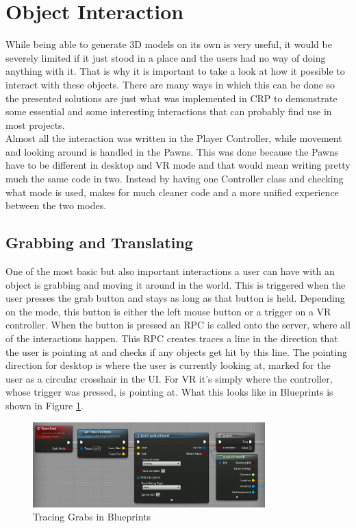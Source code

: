 
\section{Object Interaction}\label{chp:ObjectInteraction}
While being able to generate 3D models on its own is very useful, it would be severely limited if it just stood in a place and the users had no way of doing anything with it. That is why it is important to take a look at how it possible to interact with these objects. There are many ways in which this can be done so the presented solutions are just what was implemented in CRP to demonstrate some essential and some interesting interactions that can probably find use in most projects.\\
Almost all the interaction was written in the Player Controller, while movement and looking around is handled in the Pawns. This was done because the Pawns have to be different in desktop and VR mode and that would mean writing pretty much the same code in two. Instead by having one Controller class and checking what mode is used, makes for much cleaner code and a more unified experience between the two modes.
\subsection{Grabbing and Translating}

One of the most basic but also important interactions a user can have with an object is grabbing and moving it around in the world. This is triggered when the user presses the grab button and stays as long as that button is held. Depending on the mode, this button is either the left mouse button or a trigger on a VR controller. When the button is pressed an RPC is called onto the server, where all of the interactions happen. This RPC creates traces a line in the direction that the user is pointing at and checks if any objects get hit by this line. The pointing direction for desktop is where the user is currently looking at, marked for the user as a circular crosshair in the UI. For VR it's simply where the controller, whose trigger was pressed, is pointing at. What this looks like in Blueprints is shown in Figure \ref{fig:LineTracing}.

\begin{figure}[htpb]
	\centering
	\includegraphics[width=0.8\textwidth]{fig/LineTracing2.png}
	\caption[Tracing Grabs in Blueprints]{Tracing Grabs in Blueprints\protect}
	\label{fig:LineTracing}
\end{figure}

